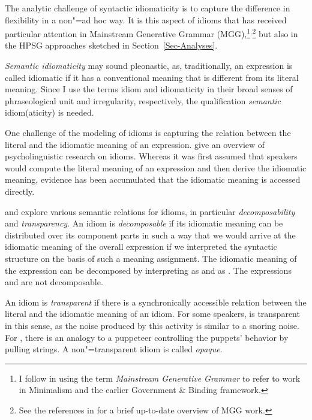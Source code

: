 \documentclass[output=paper
 	        ,biblatex
                ,babelshorthands
                ,newtxmath
                ,draftmode
                ,colorlinks, citecolor=brown
]{langscibook}
\begin{document}
The analytic challenge of syntactic idiomaticity is to capture the difference in flexibility in a
non"=ad hoc way. It is this aspect of idioms that has received particular attention in Mainstream
Generative Grammar (MGG),\footnote{%
  I follow \citet[]{CJ2005a} in using the term \emph{Mainstream Generative Grammar} to
  refer to work in Minimalism and the earlier Government \& Binding framework.}$^,$\footnote{See the
  references in \citet{Corver:al:19} for a brief up-to-date overview of MGG work.}
but also in the HPSG approaches sketched in Section~\ref{Sec-Analyses}.

\emph{Semantic idiomaticity} may sound pleonastic, as, traditionally, an expression is called idiomatic if it has a conventional meaning that is different from its literal meaning. 
Since I use the terms idiom and idiomaticity in their broad senses of phraseological unit and irregularity, respectively, the qualification \emph{semantic} idiom(aticity) is needed. 

One challenge of the modeling of idioms is capturing the relation between the literal and the idiomatic meaning of an expression.
\citet{Gibbs:Colston:07} give an overview of 
psycholinguistic research on idioms. Whereas it was first assumed that speakers would compute the literal meaning of an expression and then derive the idiomatic meaning, evidence has been accumulated that the idiomatic meaning is accessed directly.

\citet{WSN84a-u} and \citet{NSW94a} explore various semantic relations for idioms, in particular \emph{decomposability} and \emph{transparency}.
An idiom is \emph{decomposable} if its idiomatic meaning can be distributed over its component parts in such a way that we would arrive at the idiomatic meaning of the overall expression if we interpreted the syntactic structure on the basis of such a meaning assignment. 
The idiomatic meaning of the expression  can be decomposed by interpreting  as  and  as . 
The expressions  and  are not decomposable.

An idiom is \emph{transparent} if there is a synchronically accessible relation between the literal and the idiomatic meaning of an idiom. 
For some speakers,  is transparent in this sense, as the noise produced by this activity is similar to a snoring noise. 
For , there is an analogy to a puppeteer controlling the puppets' behavior by pulling strings. A non"=transparent idiom is called \emph{opaque}. 
\end{document}
